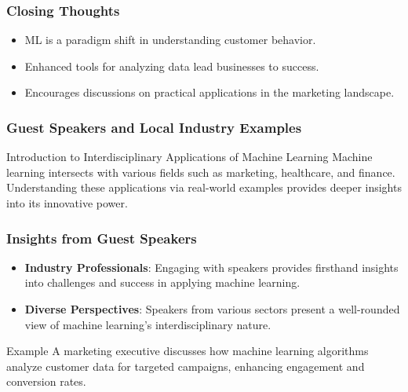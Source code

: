 \documentclass[aspectratio=169]{beamer}
\begin{document}
\begin{frame}
    \frametitle{Closing Thoughts}
    \begin{itemize}
        \item ML is a paradigm shift in understanding customer behavior.
        \item Enhanced tools for analyzing data lead businesses to success.
        \item Encourages discussions on practical applications in the marketing landscape.
    \end{itemize}
\end{frame}

\begin{frame}[fragile]
    \frametitle{Guest Speakers and Local Industry Examples}
    \begin{block}{Introduction to Interdisciplinary Applications of Machine Learning}
        Machine learning intersects with various fields such as marketing, healthcare, and finance.
        Understanding these applications via real-world examples provides deeper insights into its innovative power.
    \end{block}
\end{frame}

\begin{frame}[fragile]
    \frametitle{Insights from Guest Speakers}
    \begin{itemize}
        \item \textbf{Industry Professionals}: Engaging with speakers provides firsthand insights into challenges and success in applying machine learning.
        \item \textbf{Diverse Perspectives}: Speakers from various sectors present a well-rounded view of machine learning's interdisciplinary nature.
    \end{itemize}
    
    \begin{block}{Example}
        A marketing executive discusses how machine learning algorithms analyze customer data for targeted campaigns, enhancing engagement and conversion rates.
    \end{block}
\end{frame}
\end{document}
